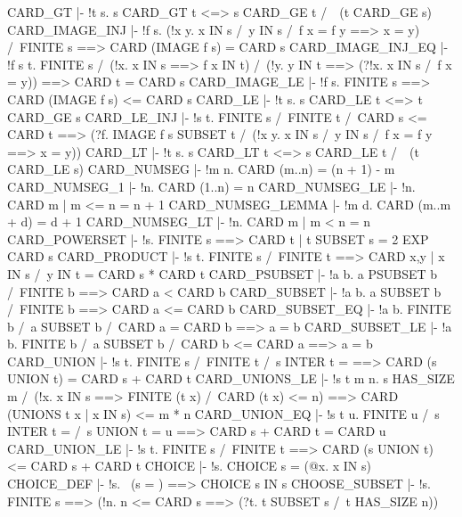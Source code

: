 \THEOREM CARD\_GT
  |- !t s. s CARD_GT t <=> s CARD_GE t /\ ~(t CARD_GE s)
\ENDTHEOREM
\THEOREM CARD\_IMAGE\_INJ
  |- !f s.
         (!x y. x IN s /\ y IN s /\ f x = f y ==> x = y) /\ FINITE s
         ==> CARD (IMAGE f s) = CARD s
\ENDTHEOREM
\THEOREM CARD\_IMAGE\_INJ\_EQ
  |- !f s t.
         FINITE s /\
         (!x. x IN s ==> f x IN t) /\
         (!y. y IN t ==> (?!x. x IN s /\ f x = y))
         ==> CARD t = CARD s
\ENDTHEOREM
\THEOREM CARD\_IMAGE\_LE
  |- !f s. FINITE s ==> CARD (IMAGE f s) <= CARD s
\ENDTHEOREM
\THEOREM CARD\_LE
  |- !t s. s CARD_LE t <=> t CARD_GE s
\ENDTHEOREM
\THEOREM CARD\_LE\_INJ
  |- !s t.
         FINITE s /\ FINITE t /\ CARD s <= CARD t
         ==> (?f. IMAGE f s SUBSET t /\
                  (!x y. x IN s /\ y IN s /\ f x = f y ==> x = y))
\ENDTHEOREM
\THEOREM CARD\_LT
  |- !t s. s CARD_LT t <=> s CARD_LE t /\ ~(t CARD_LE s)
\ENDTHEOREM
\THEOREM CARD\_NUMSEG
  |- !m n. CARD (m..n) = (n + 1) - m
\ENDTHEOREM
\THEOREM CARD\_NUMSEG\_1
  |- !n. CARD (1..n) = n
\ENDTHEOREM
\THEOREM CARD\_NUMSEG\_LE
  |- !n. CARD {m | m <= n} = n + 1
\ENDTHEOREM
\THEOREM CARD\_NUMSEG\_LEMMA
  |- !m d. CARD (m..m + d) = d + 1
\ENDTHEOREM
\THEOREM CARD\_NUMSEG\_LT
  |- !n. CARD {m | m < n} = n
\ENDTHEOREM
\THEOREM CARD\_POWERSET
  |- !s. FINITE s ==> CARD {t | t SUBSET s} = 2 EXP CARD s
\ENDTHEOREM
\THEOREM CARD\_PRODUCT
  |- !s t.
         FINITE s /\ FINITE t
         ==> CARD {x,y | x IN s /\ y IN t} = CARD s * CARD t
\ENDTHEOREM
\THEOREM CARD\_PSUBSET
  |- !a b. a PSUBSET b /\ FINITE b ==> CARD a < CARD b
\ENDTHEOREM
\THEOREM CARD\_SUBSET
  |- !a b. a SUBSET b /\ FINITE b ==> CARD a <= CARD b
\ENDTHEOREM
\THEOREM CARD\_SUBSET\_EQ
  |- !a b. FINITE b /\ a SUBSET b /\ CARD a = CARD b ==> a = b
\ENDTHEOREM
\THEOREM CARD\_SUBSET\_LE
  |- !a b. FINITE b /\ a SUBSET b /\ CARD b <= CARD a ==> a = b
\ENDTHEOREM
\THEOREM CARD\_UNION
  |- !s t.
         FINITE s /\ FINITE t /\ s INTER t = {}
         ==> CARD (s UNION t) = CARD s + CARD t
\ENDTHEOREM
\THEOREM CARD\_UNIONS\_LE
  |- !s t m n.
         s HAS_SIZE m /\ (!x. x IN s ==> FINITE (t x) /\ CARD (t x) <= n)
         ==> CARD (UNIONS {t x | x IN s}) <= m * n
\ENDTHEOREM
\THEOREM CARD\_UNION\_EQ
  |- !s t u.
         FINITE u /\ s INTER t = {} /\ s UNION t = u
         ==> CARD s + CARD t = CARD u
\ENDTHEOREM
\THEOREM CARD\_UNION\_LE
  |- !s t. FINITE s /\ FINITE t ==> CARD (s UNION t) <= CARD s + CARD t
\ENDTHEOREM
\THEOREM CHOICE
  |- !s. CHOICE s = (@x. x IN s)
\ENDTHEOREM
\THEOREM CHOICE\_DEF
  |- !s. ~(s = {}) ==> CHOICE s IN s
\ENDTHEOREM
\THEOREM CHOOSE\_SUBSET
  |- !s. FINITE s ==> (!n. n <= CARD s ==> (?t. t SUBSET s /\ t HAS_SIZE n))
